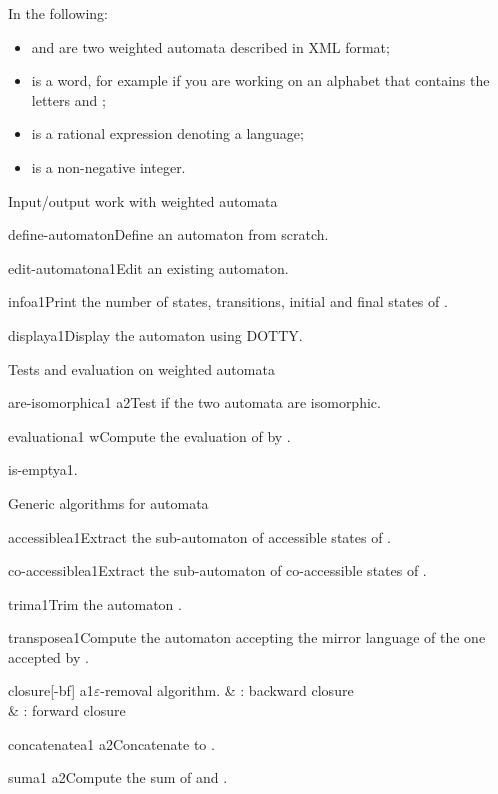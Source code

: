 \smallskip

In the following:

\begin{itemize}
\item {} and  are two weighted automata described in
  \Vauc XML format;
\item {} is a word, for example  if you are working on
  an alphabet that contains the letters  and ;
\item {} is a rational expression denoting a language;
\item {} is a non-negative integer.
\end{itemize}


\begin{fnsection}{Input/output work with weighted automata}
\item{define-automaton}{}{Define an automaton from scratch.}
\item{edit-automaton}{a1}{Edit an existing automaton.}
\item{info}{a1}{Print the number of states, transitions, initial and
    final states of .}
\item{display}{a1}{Display the automaton using DOTTY.}  \hline
\end{fnsection}

\begin{fnsection}{Tests and evaluation on weighted automata}
\item{are-isomorphic}{a1 a2}{Test if the two automata are isomorphic.}
\item{evaluation}{a1 w}{Compute the evaluation of  by
    .}
\item{is-empty}{a1}{.}  \hline
\end{fnsection}

\begin{fnsection}{Generic algorithms for automata}
\item{accessible}{a1}{Extract the sub-automaton of accessible states
    of .}
\item{co-accessible}{a1}{Extract the sub-automaton of co-accessible
    states of .}
\item{trim}{a1}{Trim the automaton .}
\item{transpose}{a1}{Compute the automaton accepting the mirror
    language of the one accepted by .}
\item{closure}{[-bf] a1}{$\varepsilon$-removal algorithm.}
  &  : backward closure\\
  &  : forward closure\\
\item{concatenate}{a1 a2}{Concatenate  to .}
\item{sum}{a1 a2}{Compute the sum of  and .}
\end{fnsection}


